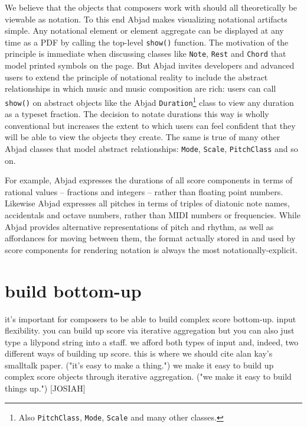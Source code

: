\documentclass{article}
\begin{document}
\hrulefill\vspace{5pt}

We believe that the objects that composers work with should all theoretically
be viewable as notation. To this end Abjad makes visualizing notational
artifacts simple. Any notational element or element aggregate can be displayed
at any time as a PDF by calling the top-level \texttt{show()} function. The
motivation of the principle is immediate when discussing classes like
\texttt{Note}, \texttt{Rest} and \texttt{Chord} that model printed symbols on
the page. But Abjad invites developers and advanced users to extend the
principle of notational reality to include the abstract relationships in which
music and music composition are rich: users can call \texttt{show()} on
abstract objects like the Abjad \texttt{Duration}\footnote{Also
\texttt{PitchClass}, \texttt{Mode}, \texttt{Scale} and many other classes.}
class to view any duration as a typeset fraction. The decision to notate
durations this way is wholly conventional but increases the extent to which
users can feel confident that they will be able to view the objects they
create. The same is true of many other Abjad classes that model abstract
relationships: \texttt{Mode}, \texttt{Scale}, \texttt{PitchClass} and so on.

For example, Abjad expresses the durations of all score components in terms of
rational values -- fractions and integers -- rather than floating point
numbers. Likewise Abjad expresses all pitches in terms of triples of diatonic
note names, accidentals and octave numbers, rather than MIDI numbers or
frequencies. While Abjad provides alternative representations of pitch and
rhythm, as well as affordances for moving between them, the format actually
stored in and used by score components for rendering notation is always the
most notationally-explicit.

\section{build bottom-up}

it's important for composers to be able to build complex
score bottom-up. input flexibility. you can build up score via iterative
aggregation but you can also just type a lilypond string into a staff. we
afford both types of input and, indeed, two different ways of building up
score. this is where we should cite alan kay's smalltalk paper. ("it's easy to
make a thing.") we make it easy to build up complex score objects through
iterative aggregation. ("we make it easy to build things up.") [JOSIAH]
\end{document}
